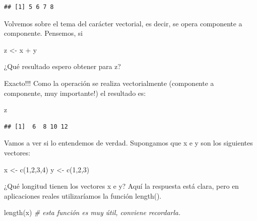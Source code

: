 \documentclass[
]{book}
\newenvironment{Shaded}{\begin{snugshade}}{\end{snugshade}}
\newcommand{\CommentTok}[1]{\textcolor[rgb]{0.56,0.35,0.01}{\textit{#1}}}
\newcommand{\DecValTok}[1]{\textcolor[rgb]{0.00,0.00,0.81}{#1}}
\newcommand{\FunctionTok}[1]{\textcolor[rgb]{0.00,0.00,0.00}{#1}}
\newcommand{\NormalTok}[1]{#1}
\newcommand{\OtherTok}[1]{\textcolor[rgb]{0.56,0.35,0.01}{#1}}
\newcommand{\SpecialCharTok}[1]{\textcolor[rgb]{0.00,0.00,0.00}{#1}}
\begin{document}
\begin{verbatim}
## [1] 5 6 7 8
\end{verbatim}

Volvemos sobre el tema del carácter vectorial, es decir, se opera componente a componente. Pensemos, si

\begin{Shaded}
\begin{Highlighting}[]
\NormalTok{z }\OtherTok{\textless{}{-}}\NormalTok{ x }\SpecialCharTok{+}\NormalTok{ y}
\end{Highlighting}
\end{Shaded}

¿Qué resultado espero obtener para z?

Exacto!!! Como la operación se realiza vectorialmente (componente a componente, muy importante!) el resultado es:

\begin{Shaded}
\begin{Highlighting}[]
\NormalTok{z}
\end{Highlighting}
\end{Shaded}

\begin{verbatim}
## [1]  6  8 10 12
\end{verbatim}

Vamos a ver si lo entendemos de verdad. Supongamos que x e y son los siguientes vectores:

\begin{Shaded}
\begin{Highlighting}[]
\NormalTok{x }\OtherTok{\textless{}{-}} \FunctionTok{c}\NormalTok{(}\DecValTok{1}\NormalTok{,}\DecValTok{2}\NormalTok{,}\DecValTok{3}\NormalTok{,}\DecValTok{4}\NormalTok{)}
\NormalTok{y }\OtherTok{\textless{}{-}} \FunctionTok{c}\NormalTok{(}\DecValTok{1}\NormalTok{,}\DecValTok{2}\NormalTok{,}\DecValTok{3}\NormalTok{)}
\end{Highlighting}
\end{Shaded}

¿Qué longitud tienen los vectores x e y? Aquí la respuesta está clara, pero en aplicaciones reales utilizaríamos la función length().

\begin{Shaded}
\begin{Highlighting}[]
\FunctionTok{length}\NormalTok{(x)                }\CommentTok{\# esta función es muy útil, conviene recordarla.}
\end{Highlighting}
\end{Shaded}
\end{document}
